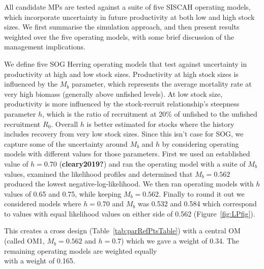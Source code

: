\documentclass[11pt]{book}
\begin{document}
All candidate MPs are tested against a suite of five SISCAH operating models, which incorporate uncertainty in future productivity at both low and high stock sizes. We first summarise the simulation approach, and then present results weighted over the five operating models, with some brief discussion of the management implications.


\clearpage

\hypertarget{simulation-approach}{%
\label{simulation-approach}}

\hypertarget{operating-models}{%
\label{operating-models}}

We define five SOG Herring operating models that test against uncertainty in productivity at high and low stock sizes. Productivity at high stock sizes is influenced by the \(M_b\) parameter, which represents the average mortality rate at very high biomass (generally above unfished levels). At low stock size, productivity is more influenced by the stock-recruit relationship's steepness parameter \(h\), which is the ratio of recruitment at 20\% of unfished to the unfished recruitment \(R_0\). Overall \(h\) is better estimated for stocks where the history includes recovery from very low stock sizes. Since this isn't case for SOG, we capture some of the uncertainty around \(M_b\) and \(h\) by considering operating models with different values for those parameters. First we used an established value of \(h=0.70\) (\textbf{cleary2019?}) and ran the operating model with a suite of \(M_b\) values, examined the likelihood profiles and determined that \(M_b=0.562\) produced the lowest negative-log-likelihood. We then ran operating models with \(h\) values of 0.65 and 0.75, while keeping \(M_b=0.562\). Finally to round it out we considered models where \(h=0.70\) and \(M_b\) was 0.532 and 0.584 which correspond to values with equal likelihood values on either side of 0.562 (Figure~\ref{fig:LPfig}).

This creates a cross design (Table~\ref{tab:parRefPtsTable}) with a central OM (called OM1, \(M_b=0.562\) and \(h = 0.7\)) which we gave a weight of 0.34. The remaining operating models are weighted equally\\
with a weight of 0.165.
\end{document}
